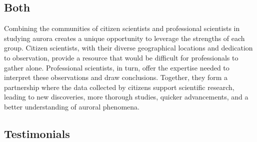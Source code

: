 \documentclass{article}
\begin{document}
\subsection{Both}
Combining the communities of citizen scientists and professional scientists in studying aurora creates a unique opportunity to leverage the strengths of each group. Citizen scientists, with their diverse geographical locations and dedication to observation, provide a resource that would be difficult for professionals to gather alone. Professional scientists, in turn, offer the expertise needed to interpret these observations and draw conclusions. Together, they form a partnership where the data collected by citizens support scientific research, leading to new discoveries, more thorough studies, quicker advancements, and a better understanding of auroral phenomena.


\subsection{Testimonials}
\end{document}
